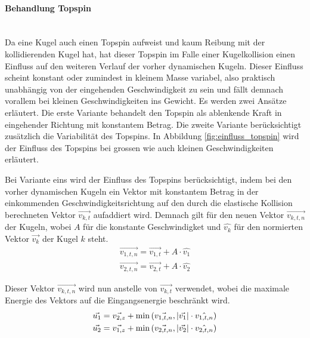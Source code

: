 \paragraph{Behandlung Topspin} \hfill \\
Da eine Kugel auch einen Topspin aufweist und kaum Reibung mit der kollidierenden Kugel hat, hat dieser Topspin im
Falle einer Kugelkollision einen Einfluss auf den weiteren Verlauf der vorher dynamischen Kugeln.
Dieser Einfluss scheint konstant oder zumindest in kleinem Masse variabel, also praktisch unabhängig von der eingehenden Geschwindigkeit zu sein
und fällt demnach vorallem bei kleinen Geschwindigkeiten ins Gewicht. Es werden zwei Ansätze erläutert.
Die erste Variante behandelt den Topspin als ablenkende Kraft in eingehender Richtung mit konstantem Betrag.
Die zweite Variante berücksichtigt zusätzlich die Variabilität des Topspins. In Abbildung \ref{fig:einfluss_topspin} wird der Einfluss des
Topspins bei grossen wie auch kleinen Geschwindigkeiten erläutert.

Bei Variante eins wird der Einfluss des Topspins berücksichtigt,
indem bei den vorher dynamischen Kugeln ein Vektor mit konstantem
Betrag in der einkommenden Geschwindigkeitsrichtung auf den durch die elastische Kollision berechneten Vektor
$\vec{v_{k,t}}$ aufaddiert wird. Demnach gilt für den neuen Vektor $\vec{v_{k,t,n}}$ der Kugeln, wobei $A$ für die konstante Geschwindigket und
$\hat{v_k}$ für den normierten Vektor $\vec{v_k}$ der Kugel $k$ steht.
\begin{align}
    \vec{v_{1,t,n}} = \vec{v_{1,t}} + A \cdot \hat{v_1}\\
    \vec{v_{2,t,n}} = \vec{v_{2,t}} + A \cdot \hat{v_2}
\end{align}

Dieser Vektor $\vec{v_{k,t,n}}$ wird nun anstelle von $\vec{v_{k,t}}$ verwendet, wobei die maximale Energie des Vektors
auf die Eingangsenergie beschränkt wird.
\begin{align}
    \vec{u_1} = \vec{v_{2,z}} + \min{(\vec{v_{1,t,n}}, \lvert \vec{v_1} \rvert \cdot \hat{{v_{1,t,n}}})}\\
    \vec{u_2} = \vec{v_{1,z}} + \min{(\vec{v_{2,t,n}}, \lvert \vec{v_2} \rvert \cdot \hat{v_{2,t,n}})}
\end{align}

